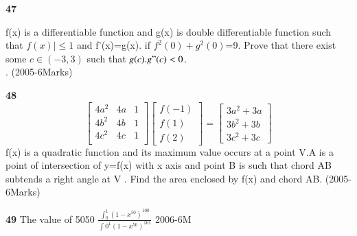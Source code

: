 \documentclass[journal,12pt,twocolumn]{IEEEtran}
\theoremstyle{remark}
\begin{document}
																							        \textbf{47}
																								   
																								      f(x) is a differentiable function and g(x) is  double differentiable function such that $f(x)|\le1$ and f'(x)=g(x). if $f^2(0)+g^2(0)$=9. Prove that there exist some $c\in(-3,3)$ such that $g(c).g"(c)<0$.\\.
																								         \hfill{(2005-6Marks)}

																									    \textbf{48}
																									       \[
																									          \begin{bmatrix}
																										     4a^2 & 4a & 1\\
																										        4b^2 & 4b & 1\\
																											   4c^2 & 4c & 1\\
																											      \end{bmatrix}
																											         \begin{bmatrix}
																												        f(-1)\\
																													       f(1)\\
																													              f(2)
																														         \end{bmatrix}
																															    =
																															       \begin{bmatrix}
																															          3a^2+3a\\
																																     3b^2+3b\\
																																        3c^2+3c
																																	   \end{bmatrix}
																																	       \]
																																	          f(x) is a quadratic function and its maximum value occurs at a point V.A is a point of intersection of y=f(x) with x axis and point B is such that chord AB subtends a right angle at V . Find the area enclosed by f(x) and chord AB.
																																		    \hfill{(2005-6Marks)}

																																		      \textbf{49}
																																		        The value of 5050 $\frac{\int_{0}^{1}(1-x^50)^100}{\int{0}^{1} {(1-x^50)^101}}$
																																			  \hfill{2006-6M}

																																			     
																																			        
																																				  





																																				    
\end{document}
